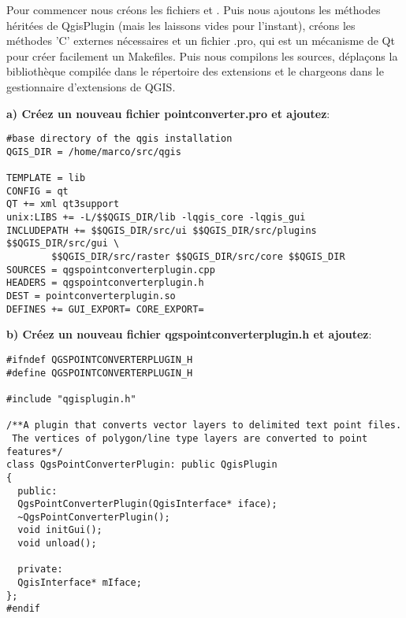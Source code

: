 
Pour commencer nous créons les fichiers  et 
. Puis nous ajoutons les méthodes héritées de 
QgisPlugin (mais les laissons vides pour l'instant), créons les méthodes 'C' 
externes nécessaires et un fichier .pro, qui est un mécanisme de Qt pour créer 
facilement un Makefiles. Puis nous compilons les sources, déplaçons la 
bibliothèque compilée dans le répertoire des extensions et le chargeons dans le 
gestionnaire d'extensions de QGIS.

\textbf{a) Créez un nouveau fichier pointconverter.pro et ajoutez}:

\begin{verbatim}
#base directory of the qgis installation
QGIS_DIR = /home/marco/src/qgis

TEMPLATE = lib
CONFIG = qt
QT += xml qt3support
unix:LIBS += -L/$$QGIS_DIR/lib -lqgis_core -lqgis_gui
INCLUDEPATH += $$QGIS_DIR/src/ui $$QGIS_DIR/src/plugins  $$QGIS_DIR/src/gui \
        $$QGIS_DIR/src/raster $$QGIS_DIR/src/core $$QGIS_DIR 
SOURCES = qgspointconverterplugin.cpp
HEADERS = qgspointconverterplugin.h
DEST = pointconverterplugin.so
DEFINES += GUI_EXPORT= CORE_EXPORT=
\end{verbatim}

\textbf{b) Créez un nouveau fichier qgspointconverterplugin.h et ajoutez}:

\begin{verbatim}
#ifndef QGSPOINTCONVERTERPLUGIN_H
#define QGSPOINTCONVERTERPLUGIN_H

#include "qgisplugin.h"

/**A plugin that converts vector layers to delimited text point files.
 The vertices of polygon/line type layers are converted to point features*/
class QgsPointConverterPlugin: public QgisPlugin
{
  public:
  QgsPointConverterPlugin(QgisInterface* iface);
  ~QgsPointConverterPlugin();
  void initGui();
  void unload();
  
  private:
  QgisInterface* mIface;
};
#endif
\end{verbatim}

